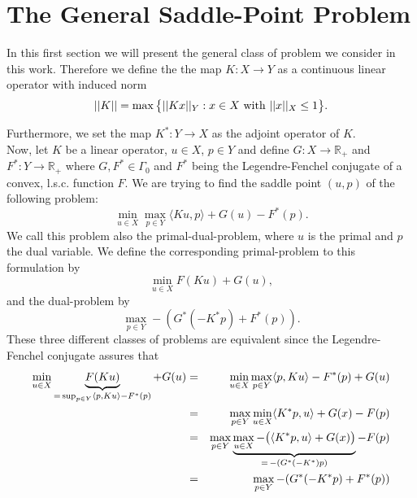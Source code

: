 \section{The General Saddle-Point Problem} %
\label{sec:the_general_saddle_point_problem}
    
    In this first section we will present the general class of problem we consider in this work. Therefore we define the the map $K: X \longrightarrow Y$ as a continuous linear operator with induced norm
        \begin{equation}
            ||K|| = \max \big\{ ||Kx||_{Y} : x \in X \,\, \textnormal{with} \,\, ||x||_{X} \le 1 \big\}.
            \label{eq:operator_norm}
        \end{equation}

    Furthermore, we set the map $K^{\ast}: Y \longrightarrow X$ as the adjoint operator of $K$.\\
    Now, let $K$ be a linear operator, $u \in X$, $p \in Y$ and define $G: X \longrightarrow \mathbb{R}_{+}$ and $F^{\ast}: Y \longrightarrow \mathbb{R}_{+}$ where $G, F^{\ast} \in \Gamma_{0}$ and $F^{\ast}$ being the Legendre-Fenchel conjugate of a convex, l.s.c. function $F$. We are trying to find the saddle point $(u, p)$ of the following problem:
        \begin{equation}
            \min_{u \in X} \max_{p \in Y} \langle Ku, p \rangle + G(u) - F^{\ast}(p).
            \label{eq:the_saddle_point_problem}
        \end{equation}
    We call this problem also the primal-dual-problem, where $u$ is the primal and $p$ the dual variable. We define the corresponding primal-problem to this formulation by
        \begin{equation}
            \min_{u \in X} F(Ku) + G(u),
            \label{eq:primal_problem}
        \end{equation}
    and the dual-problem by
        \begin{equation}
            \max_{p \in Y} -(G^{\ast}(-K^{\ast}p) + F^{\ast}(p)).
            \label{eq:dual_problem}
        \end{equation}
    These three different classes of problems are equivalent since the Legendre-Fenchel conjugate assures that
        \begin{eqnarray}
            \min_{u \in X} \underbrace{F(Ku)}_{=\, \sup_{p \in Y} \langle p, Ku \rangle - F^{\ast}(p)} + G(u) &=& \min_{u \in X} \max_{p \in Y} \langle p, Ku \rangle - F^{\ast}(p) + G(u) \notag \\
            &=& \max_{p \in Y} \min_{u \in X} \langle K^{\ast}p, u \rangle + G(x) - F(p) \notag \\
            &=& \max_{p \in Y} \underbrace{\max_{u \in X} -\big( \langle K^{\ast}p, u \rangle + G(x) \big)}_{=\, -(G^{\ast}(-K^{\ast})p)} - F(p) \notag \\
            &=& \max_{p \in Y} -(G^{\ast}(-K^{\ast}p) + F^{\ast}(p))
            \label{eq:swap_min_to_max}
        \end{eqnarray}
